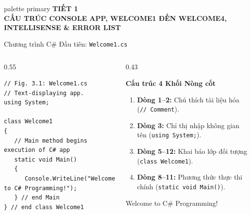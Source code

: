\documentclass[aspectratio=169, 10pt]{beamer}
\begin{document}
\begin{frame}[plain]
  \vfill
  \centering
  \begin{beamercolorbox}[sep=8pt,center,shadow=true,rounded=true]{palette primary}
    {\Huge \textbf{TIẾT 1}}\\[2mm]
    {\Large \textbf{CẤU TRÚC CONSOLE APP, WELCOME1 ĐẾN WELCOME4, INTELLISENSE \& ERROR LIST}}
  \end{beamercolorbox}
  \vfill
\end{frame}

\begin{frame}[fragile]{Chương trình C\# Đầu tiên: \texttt{Welcome1.cs}}
  \begin{columns}[T]
    \begin{column}{0.55\textwidth}
      \begin{tcolorbox}[colback=CodeBg,colframe=UniNavy,title=\textbf{Welcome1.cs (Fig. 3.1)},fonttitle=\small\bfseries]
\begin{lstlisting}
// Fig. 3.1: Welcome1.cs
// Text-displaying app.
using System;

class Welcome1
{
   // Main method begins execution of C# app
   static void Main()
   {
      Console.WriteLine("Welcome to C# Programming!");
   } // end Main
} // end class Welcome1
\end{lstlisting}
      \end{tcolorbox}
    \end{column}

    \begin{column}{0.43\textwidth}
      \begin{exampleblock}{\textbf{Cấu trúc 4 Khối Nòng cốt}}
        \begin{enumerate}\small
          \item \textbf{Dòng 1--2:} Chú thích tài liệu hóa (\texttt{// Comment}).
          \item \textbf{Dòng 3:} Chỉ thị nhập không gian tên (\texttt{using System;}).
          \item \textbf{Dòng 5--12:} Khai báo lớp đối tượng (\texttt{class Welcome1}).
          \item \textbf{Dòng 8--11:} Phương thức thực thi chính (\texttt{static void Main()}).
        \end{enumerate}
      \end{exampleblock}

      \begin{tcolorbox}[colback=UniDark,colframe=black,title=\textbf{Màn hình Console Output},fonttitle=\scriptsize\bfseries]
        \color{white}\ttfamily\scriptsize
        Welcome to C\# Programming!
      \end{tcolorbox}
    \end{column}
  \end{columns}
\end{frame}
\end{document}
